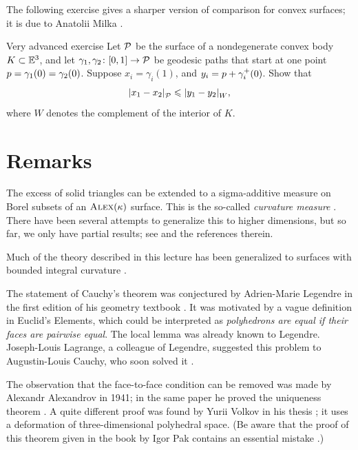 The following exercise gives a sharper version of comparison for convex surfaces;
it is due to Anatolii Milka \cite[Theorem 2]{milka1982}.

\begin{thm}{Very advanced exercise}\label{ex:milka}
Let $\mathcal{P}$ be the surface of a nondegenerate convex body $K\subset\mathbb{E}^3$,
and let $\gamma_1,\gamma_2\colon [0,1]\to\mathcal{P}$ be geodesic paths that start at one point $p\z=\gamma_1(0)\z=\gamma_2(0)$.
Suppose $x_i=\gamma_i(1)$, and $y_i\z=p+\gamma_i^+(0)$.
Show that
\[\dist{x_1}{x_2}{\spc{P}}\le \dist{y_1}{y_2}{W},\]
where $W$ denotes the complement of the interior of $K$.

\end{thm}



\section{Remarks}

The excess of solid triangles can be extended to a sigma-additive measure on Borel subsets of an $\textup{\textsc{Alex}}(\kappa)$ surface.
This is the so-called \emph{curvature measure} \cite[V]{alexandrov-1948}.
There have been several attempts to generalize this to higher dimensions, but so far, we only have partial results; see \cite{gigli2018, lebedeva-petrunin2024b} and the references therein.

Much of the theory described in this lecture has been generalized to surfaces with bounded integral curvature \cite{alexandrov-zalgaller,reshetnyak1993}.

The statement of Cauchy's theorem was conjectured by Adrien-Marie Legendre in the first edition of his geometry textbook \cite{legendre}.
It was motivated by a vague definition in Euclid's Elements, which could be interpreted as
\textit{polyhedrons are equal if their faces are pairwise equal}.
The local lemma was already known to Legendre.
Joseph-Louis Lagrange, a colleague of Legendre, suggested this problem to Augustin-Louis Cauchy, who soon solved it \cite{cauchy}.

The observation that the face-to-face condition can be removed was made by
Alexandr Alexandrov in 1941; in the same paper he proved the uniqueness theorem \cite{alexandrov-1941}.
A quite different proof was found by Yurii Volkov in his thesis \cite{volkov}; it uses a deformation of three-dimensional polyhedral space.
(Be aware that the proof of this theorem given in the book by Igor Pak contains an essential mistake \cite{petrunin-2023}.)

